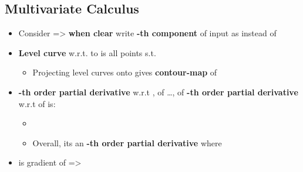 \subsection*{Multivariate Calculus}

\begin{itemize}

  \item
        Consider  =\textgreater{}
        \textbf{when clear} write \textbf{-th component} of input as
         instead of 
  \item
        \textbf{Level curve} w.r.t. to  is all points
        s.t. 

        \begin{itemize}

          \item
                Projecting level curves onto  gives
                \textbf{contour-map} of 
        \end{itemize}
  \item
        \textbf{-th order partial derivative} w.r.t
        , of \ldots, of \textbf{-th order
          partial derivative} w.r.t  of  is:

        \begin{itemize}

          \item
          \item
                Overall, its an \textbf{-th order partial derivative} where
        \end{itemize}
  \item
        is gradient of  =\textgreater{}

        \begin{itemize}


\end{itemize}
\end{itemize}
